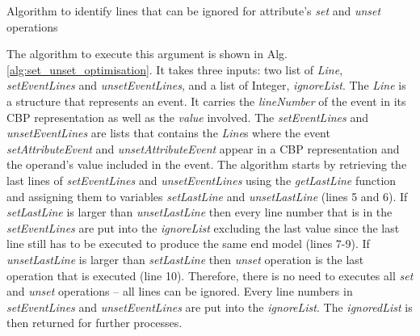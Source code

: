 \documentclass{llncs}
\begin{document}
\begin{algorithm}
\begin{small}
\end{small}
\caption{Algorithm to identify lines that can be ignored for attribute's \emph{set} and \emph{unset} operations}
\label{alg:set_unset_optimisation}
\end{algorithm}

The algorithm to execute this argument is shown in Alg. \ref{alg:set_unset_optimisation}. It takes three inputs: two list of \emph{Line}, \emph{setEventLines} and \emph{unsetEventLines}, and a list of Integer, \emph{ignoreList}. The \emph{Line} is a structure that represents an event. It carries the \emph{lineNumber} of the event in its CBP representation as well as the \emph{value} involved. The \emph{setEventLines} and \emph{unsetEventLines} are lists that contains the \emph{Line}s where the event \emph{setAttributeEvent} and \emph{unsetAttributeEvent} appear in a CBP representation and the operand's value included in the event. The algorithm starts by retrieving the last lines of \emph{setEventLines} and \emph{unsetEventLines} using the \emph{getLastLine} function and assigning them to variables \emph{setLastLine} and \emph{unsetLastLine} (lines 5 and 6). If \emph{setLastLine} is larger than \emph{unsetLastLine} then every line number that is in the \emph{setEventLines} are put into the \emph{ignoreList} excluding the last value since the last line still has to be executed to produce the same end model (lines 7-9). If \emph{unsetLastLine} is larger than \emph{setLastLine} then \emph{unset} operation is the last operation that is executed (line 10). Therefore, there is no need to executes all \emph{set} and \emph{unset} operations -- all lines can be ignored. Every line numbers in \emph{setEventLines} and \emph{unsetEventLines} are put into the \emph{ignoreList}. The \emph{ignoredList} is then returned for further processes.
\end{document}
